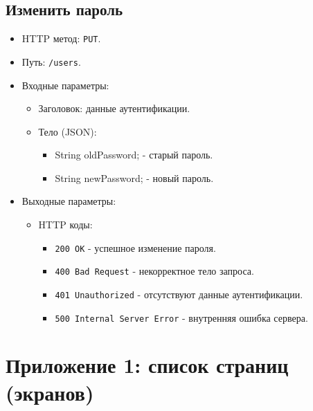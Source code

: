 \documentclass[a4paper, 14pt]{article}
\begin{document}
\subsection{Изменить пароль}

\begin{itemize}
    \item HTTP метод: \texttt{PUT}.
    \item Путь: \texttt{/users}.
    \item Входные параметры:
    \begin{itemize}
        \item Заголовок: данные аутентификации.
        \item Тело (JSON):
        \begin{itemize}
            \item String oldPassword; - старый пароль.
            \item String newPassword; - новый пароль.
        \end{itemize}
    \end{itemize}
    \item Выходные параметры:
    \begin{itemize}
        \item HTTP коды:
        \begin{itemize}
            \item \texttt{200 OK} - успешное изменение пароля.
            \item \texttt{400 Bad Request} - некорректное тело запроса.
            \item \texttt{401 Unauthorized} - отсутствуют данные аутентификации.
            \item \texttt{500 Internal Server Error} - внутренняя ошибка сервера.
        \end{itemize}
    \end{itemize}
\end{itemize}

\newpage
\section{Приложение 1: список страниц (экранов)}
\end{document}
